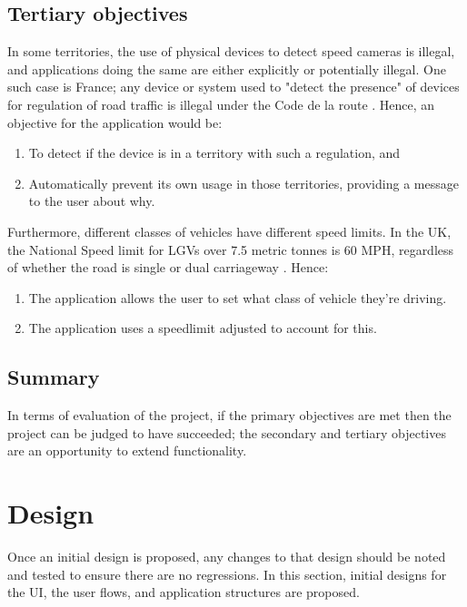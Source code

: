 \documentclass[11pt, a4paper, notitlepage]{report}
\newcounter{objectivesCounter}
\begin{document}
\section{Tertiary objectives}
In some territories, the use of physical devices to detect speed cameras is illegal, and applications doing the same are either explicitly or potentially illegal. One such case is France; any device or system used to "detect the presence" of devices for regulation of road traffic is illegal under the Code de la route \citep{CodeDeLaRoute}. Hence, an objective for the application would be:
\begin{enumerate}
	\setcounter{enumi}{\value{objectivesCounter}}
	\item To detect if the device is in a territory with such a regulation, and
	\item Automatically prevent its own usage in those territories, providing a message to the user about why.
	\setcounter{objectivesCounter}{\value{enumi}}
\end{enumerate}

Furthermore, different classes of vehicles have different speed limits. In the UK, the National Speed limit for LGVs over 7.5 metric tonnes is 60 MPH, regardless of whether the road is single or dual carriageway \citep{GovUKSpeedLimits}. Hence:
\begin{enumerate}
	\setcounter{enumi}{\value{objectivesCounter}}
	\item The application allows the user to set what class of vehicle they're driving.
	\item The application uses a speedlimit adjusted to account for this.
	\setcounter{objectivesCounter}{\value{enumi}}
\end{enumerate}

\section{Summary}
In terms of evaluation of the project, if the primary objectives are met then the project can be judged to have succeeded; the secondary and tertiary objectives are an opportunity to extend functionality.

\chapter{Design}
Once an initial design is proposed, any changes to that design should be noted and tested to ensure there are no regressions. In this section, initial designs for the UI, the user flows, and application structures are proposed.
\end{document}
